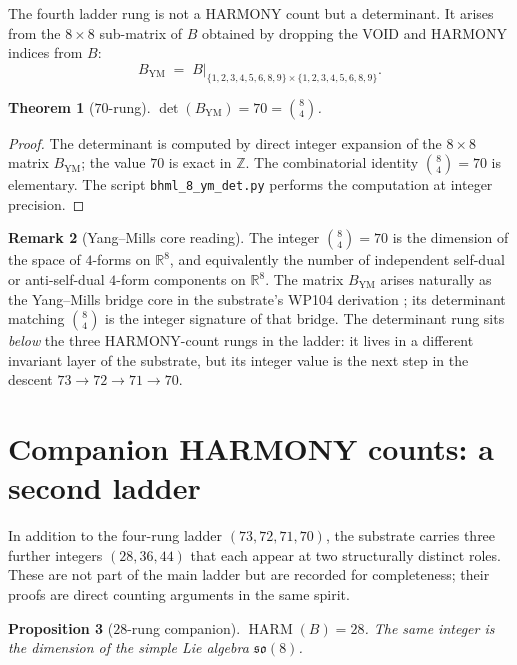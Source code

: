 \documentclass[11pt,reqno]{amsart}
\newtheorem{theorem}{Theorem}[section]
\newtheorem{proposition}[theorem]{Proposition}
\theoremstyle{definition}
\newtheorem{remark}[theorem]{Remark}
\newcommand{\Z}{\mathbb{Z}}
\newcommand{\R}{\mathbb{R}}
\DeclareMathOperator{\HARM}{HARM}
\begin{document}
The fourth ladder rung is not a HARMONY count but a determinant. It
arises from the $8 \times 8$ sub-matrix of $B$ obtained by dropping
the VOID and HARMONY indices from $B$:
\[
  B_{\mathrm{YM}} \;=\; B|_{\{1,2,3,4,5,6,8,9\} \times \{1,2,3,4,5,6,8,9\}}.
\]

\begin{theorem}[$70$-rung]
\label{thm:70}
$\det(B_{\mathrm{YM}}) = 70 = \binom{8}{4}$.
\end{theorem}

\begin{proof}
The determinant is computed by direct integer expansion of the
$8 \times 8$ matrix $B_{\mathrm{YM}}$; the value $70$ is exact in
$\Z$. The combinatorial identity $\binom{8}{4} = 70$ is elementary.
The script \texttt{bhml\_8\_ym\_det.py} performs the computation at
integer precision.
\end{proof}

\begin{remark}[Yang--Mills core reading]
\label{rem:70-reading}
The integer $\binom{8}{4} = 70$ is the dimension of the space of
$4$-forms on $\R^8$, and equivalently the number of independent
self-dual or anti-self-dual $4$-form components on $\R^8$. The
matrix $B_{\mathrm{YM}}$ arises naturally as the Yang--Mills bridge
core in the substrate's WP104 derivation
\cite{Sanders2026YangMills}; its determinant matching $\binom{8}{4}$
is the integer signature of that bridge. The determinant rung sits
\emph{below} the three HARMONY-count rungs in the ladder: it lives
in a different invariant layer of the substrate, but its integer
value is the next step in the descent $73 \to 72 \to 71 \to 70$.
\end{remark}

\section{Companion HARMONY counts: a second ladder}
\label{sec:companion}

In addition to the four-rung ladder $(73, 72, 71, 70)$, the substrate
carries three further integers $(28, 36, 44)$ that each appear at
two structurally distinct roles. These are not part of the main
ladder but are recorded for completeness; their proofs are
direct counting arguments in the same spirit.

\begin{proposition}[$28$-rung companion]
\label{prop:28}
$\HARM(B) = 28$. The same integer is the dimension of the simple Lie
algebra $\mathfrak{so}(8)$.
\end{proposition}
\end{document}
